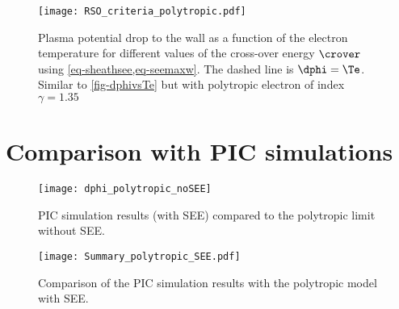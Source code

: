 \begin{figure}[hbtp]
  \centering
  \texttt{[image: RSO\_criteria\_polytropic.pdf]}
  \caption{ Plasma potential drop to the wall as a function of the electron temperature for different values of the cross-over energy $\crover$ using \cref{eq-sheathsee,eq-seemaxw}. The dashed line is $\dphi=\Te$. Similar to  \cref{fig-dphivsTe} but with polytropic electron of index $\gamma=1.35$}
  \label{fig-rso_crit_see}
\end{figure}

\FloatBarrier

\section{Comparison with PIC simulations} \label{subsec-picandmodel}

\begin{figure}[hbtp]
  \centering
  \texttt{[image: dphi\_polytropic\_noSEE]}
  \caption{PIC simulation results (with SEE) compared to the polytropic limit without SEE.}
  \label{fig-polytropic_pic_noSEE}
\end{figure}

\begin{figure}[hbtp]
  \centering
  \texttt{[image: Summary\_polytropic\_SEE.pdf]}
  \caption{Comparison of the PIC simulation results with the polytropic model with SEE.}
  \label{fig-polytropic_see_summary}
\end{figure}

